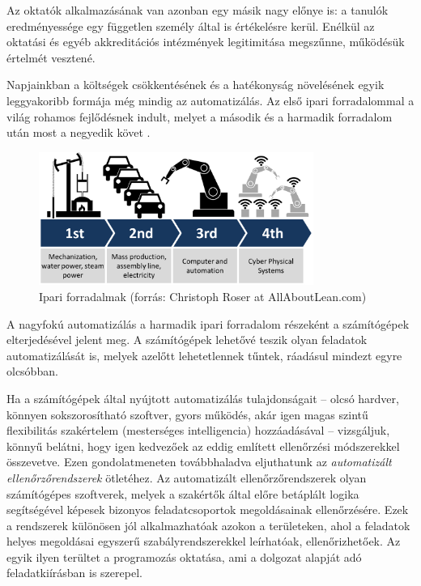 Az oktatók alkalmazásának van azonban egy másik nagy előnye is: a tanulók eredményessége egy független személy által is értékelésre kerül.
Enélkül az oktatási és egyéb akkreditációs intézmények legitimitása megszűnne, működésük értelmét vesztené.

Napjainkban a költségek csökkentésének és a hatékonyság növelésének egyik leggyakoribb formája még mindig az automatizálás.
Az első ipari forradalommal a világ rohamos fejlődésnek indult, melyet a második és a harmadik forradalom után most a negyedik követ \cite{FourthRevolution}.
\begin{figure}[h]
    \centering
    \includegraphics[width=0.8\textwidth]{figures/industrial_revolutions}
    \caption[Ipari forradalmak]{Ipari forradalmak (forrás: Christoph Roser at AllAboutLean.com)} %
\end{figure} 
A nagyfokú automatizálás a harmadik ipari forradalom részeként a számítógépek elterjedésével jelent meg.
A számítógépek lehetővé teszik olyan feladatok automatizálását is, melyek azelőtt lehetetlennek tűntek, ráadásul mindezt egyre olcsóbban.

Ha a számítógépek által nyújtott automatizálás tulajdonságait -- olcsó hardver, könnyen sokszorosítható szoftver, gyors működés, akár igen magas szintű flexibilitás szakértelem (mesterséges intelligencia) hozzáadásával -- vizsgáljuk, könnyű belátni, hogy igen kedvezőek az eddig említett ellenőrzési módszerekkel összevetve.
Ezen gondolatmeneten továbbhaladva eljuthatunk az \textit{automatizált ellenőrzőrendszerek} ötletéhez.
Az automatizált ellenőrzőrendszerek olyan számítógépes szoftverek, melyek a szakértők által előre betáplált logika segítségével képesek bizonyos feladatcsoportok megoldásainak ellenőrzésére.
Ezek a rendszerek különösen jól alkalmazhatóak azokon a területeken, ahol a feladatok helyes megoldásai egyszerű szabályrendszerekkel leírhatóak, ellenőrizhetőek.
Az egyik ilyen terültet a programozás oktatása, ami a dolgozat alapját adó feladatkiírásban is szerepel.

